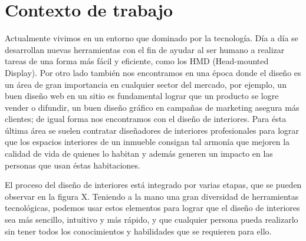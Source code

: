 \section{Contexto de trabajo}

Actualmente vivimos en un entorno que dominado por la tecnología. Día a día se desarrollan nuevas herramientas con el fin de ayudar al ser humano a realizar tareas de una forma más fácil y eficiente, como los HMD (Head-mounted Display)\cite{B15}.
Por otro lado también nos encontramos en una época donde el diseño es un área de gran importancia en cualquier sector del mercado, por ejemplo, un buen diseño web en un sitio es fundamental lograr que un producto se logre vender o difundir, un buen diseño gráfico en campañas de marketing asegura más clientes; de igual forma nos encontramos con el diseño de interiores. Para ésta última área se suelen contratar diseñadores de interiores profesionales para lograr que los espacios interiores de un inmueble consigan tal armonía que mejoren la calidad de vida de quienes lo habitan y además generen un impacto en las personas que usan éstas habitaciones.\par
El proceso del diseño de interiores está integrado por varias etapas, que se pueden observar en la figura X.
Teniendo a la mano una gran diversidad de herramientas tecnológicas, podemos usar estos elementos para lograr que el diseño de interiores sea más sencillo, intuitivo y más rápido, y que cualquier persona pueda realizarlo sin tener todos los conocimientos y habilidades que se requieren para ello.